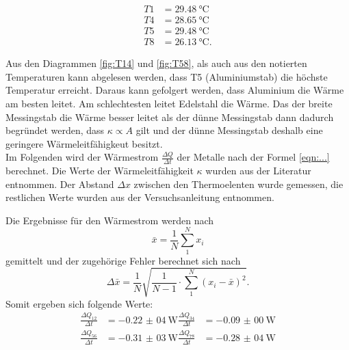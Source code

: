 \begin{align*}
  T1 &=\SI{29,48}{\celsius}\\
  T4 &=\SI{28,65}{\celsius}\\
  T5 &=\SI{29,48}{\celsius}\\
  T8 &=\SI{26,13}{\celsius}.
\end{align*}

Aus den Diagrammen \ref{fig:T14} und \ref{fig:T58}, als auch aus den notierten
Temperaturen kann abgelesen werden, dass T5 (Aluminiumstab) die höchste Temperatur erreicht.
Daraus kann gefolgert werden, dass Aluminium die Wärme am besten leitet. Am schlechtesten
leitet Edelstahl die Wärme. Das der breite Messingstab die Wärme besser leitet als der
dünne Messingstab dann dadurch begründet werden, dass $\kappa \propto A$ gilt und
der dünne Messingstab deshalb eine geringere Wärmeleitfähigkeut besitzt.\\

Im Folgenden wird der Wärmestrom $\frac{\Delta Q}{\Delta t}$
der Metalle nach der Formel \ref{eqn:...} berechnet.
Die Werte der Wärmeleitfähigkeit $\kappa$ wurden aus der Literatur \cite{chemie} entnommen.
Der Abstand $\Delta x$ zwischen den Thermoelenten wurde gemessen, die restlichen
Werte wurden aus der Versuchsanleitung \cite{skript} entnommen.


Die Ergebnisse für den Wärmestrom werden nach
\begin{equation}
  \bar{x}=\frac{1}{N}\sum_{1}^N x_{i}
  \label{eqn:mittel}
\end{equation}
gemittelt und der zugehörige Fehler berechnet sich nach
\begin{equation}
  \Delta\bar x = \frac{1}{N}\sqrt{\frac{1}{N-1}\cdot\sum_{1}^N (x_{i}-\bar x)^2}.
  \label{eqn:gauß}
\end{equation}
Somit ergeben sich folgende Werte:
\begin{align*}
  \frac{\Delta Q_{12}}{\Delta t} &=\SI{-0,22(04)}{\W}    \frac{\Delta Q_{34}}{\Delta t} &=\SI{-0,09(00)}{\W}\\
  \frac{\Delta Q_{56}}{\Delta t} &=\SI{-0,31(03)}{\W}    \frac{\Delta Q_{78}}{\Delta t} &=\SI{-0,28(04)}{\W}
\end{align*}

